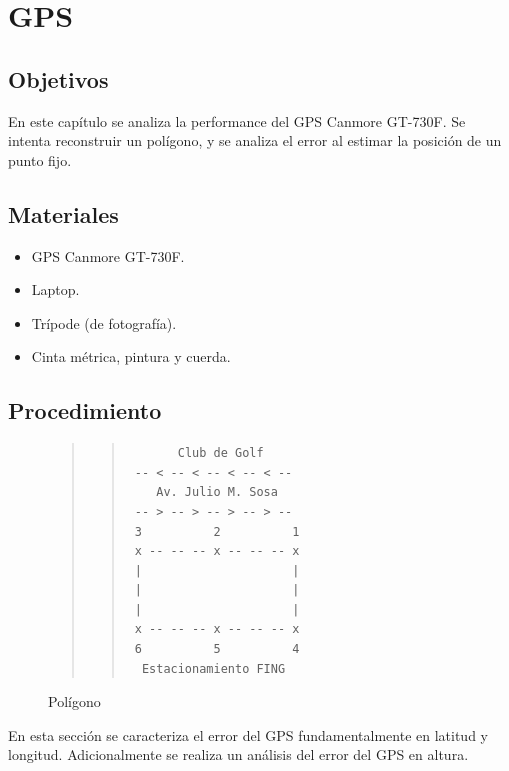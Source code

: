 \documentclass[main]{subfiles}
\begin{document}
\chapter{GPS}
\label{chap-gps}

\section{Objetivos}

En este capítulo se analiza la performance del GPS Canmore GT-730F. Se intenta reconstruir un polígono, y se analiza el error al estimar la posición de un punto fijo.

\section{Materiales}

\begin{itemize}
\item GPS Canmore GT-730F.
\item Laptop.
\item Trípode (de fotografía).
\item Cinta métrica, pintura y cuerda.
\end{itemize}

\section{Procedimiento}
\label{sec:gps2-procedimiento}

\begin{figure}
\vspace{-200pt}
\begin{quote}
\begin{quote}
\begin{verbatim}
       Club de Golf
 -- < -- < -- < -- < --
    Av. Julio M. Sosa
 -- > -- > -- > -- > --
 3          2          1
 x -- -- -- x -- -- -- x
 |                     |
 |                     |
 |                     |
 x -- -- -- x -- -- -- x
 6          5          4
  Estacionamiento FING
\end{verbatim}
\end{quote}
\end{quote}
\vspace{-10pt}
\caption{Polígono}
\vspace{-20pt}
\label{fig:pol-pedorro}
\end{figure}

En esta secci\'on se caracteriza el error del GPS fundamentalmente en latitud y longitud. Adicionalmente se realiza un an\'alisis del error del GPS en altura.
\end{document}
